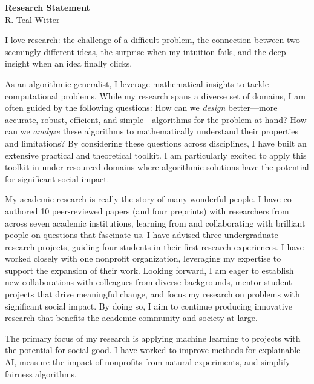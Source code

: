 \documentclass[11pt]{article}
\begin{document}
\begin{center}
	\Large \textbf{Research Statement} \\
	\vspace{.25em}
	\large{R. {\color{teal}Teal} Witter}
\end{center}

I love research: the challenge of a difficult problem, the connection between two seemingly different ideas, the surprise when my intuition fails, and the deep insight when an idea finally clicks.

As an algorithmic generalist, I leverage mathematical insights to tackle computational problems.
While my research spans a diverse set of domains, I am often guided by the following questions:
How can we \textit{design} better---more accurate, robust, efficient, and simple---algorithms for the problem at hand?
How can we \textit{analyze} these algorithms to mathematically understand their properties and limitations?
By considering these questions across disciplines, I have built an extensive practical and theoretical toolkit.
I am particularly excited to apply this toolkit in under-resourced domains where algorithmic solutions have the potential for significant social impact.

My academic research is really the story of many wonderful people.
I have co-authored 10 peer-reviewed papers (and four preprints) with researchers from across seven academic institutions, learning from and collaborating with brilliant people on questions that fascinate us.
I have advised three undergraduate research projects, guiding four students in their first research experiences.
I have worked closely with one nonprofit organization, leveraging my expertise to support the expansion of their work.
Looking forward, I am eager to establish new collaborations with colleagues from diverse backgrounds, mentor student projects that drive meaningful change, and focus my research on problems with significant social impact.
By doing so, I aim to continue producing innovative research that benefits the academic community and society at large.


The primary focus of my research is applying machine learning to projects with the potential for social good.
I have worked to improve methods for explainable AI, measure the impact of nonprofits from natural experiments, and simplify fairness algorithms.
\end{document}
